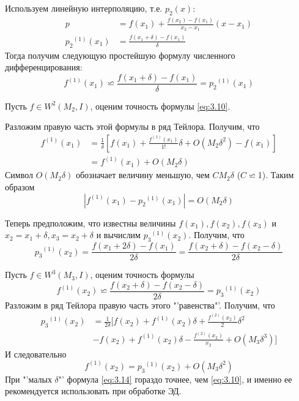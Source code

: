 Используем линейную интерполяцию, т.е. $p_2(x)$:
\begin{equation}
	\begin{aligned}
	p &= f(x_1) + \frac{f(x_2) - f(x_1)}{x_2-x_1}(x-x_1) \\
	{p_2}^{(1)}(x_1) &= \frac{f(x_1+\delta) - f(x_1)}{\delta}
	\end{aligned}
\end{equation}
Тогда получим следующую простейшую формулу численного дифференцирования:
\begin{dmath} \label{eq:3.10}
	f^{(1)}(x_1) \backsimeq \frac{f(x_1 + \delta) - f(x_1)}{\delta} = {p_2}^{(1)}(x_1)
\end{dmath}

Пусть $f \in W^2(M_2, I)$, оценим точность формулы \ref{eq:3.10}.

Разложим правую часть этой формулы в ряд Тейлора. Получим, что
\begin{dmath} 
	\begin{aligned}
f^{(1)}(x_1) &= \frac{1}{\delta} [f(x_1) + \frac{f^{(1)}(x_1)}{1!}\delta + O(M_2\delta^2)-f(x_1)] \\
&= f^{(1)}(x_1) + O(M_2 \delta)
	\end{aligned}
\end{dmath}
Символ \textbf{$O(M_2\delta)$} обозначает величину меньшую, чем $CM_2\delta$ ($C\backsimeq$1). Таким образом
\begin{equation}
	|f^{(1)}(x_1) - {p_2}^{(1)}(x_1)| = O(M_2\delta)
\end{equation}

Теперь предположим, что известны величины $f(x_1), f(x_2), f(x_3)$ и $x_2=x_1+\delta, x_3 = x_2 + \delta$ и вычислим  ${p_3}^{(1)}(x_2)$. Получим, что  
\begin{equation}
	{p_3}^{(1)}(x_2) = \frac{f(x_1+2\delta) - f(x_1)}{2\delta} = \frac{f(x_2+\delta) - f(x_2 - \delta)}{2\delta}
\end{equation}

Пусть $f \in W^3(M_3, I)$, оценим точность формулы
\begin{equation} \label{eq:3.14}
	f^{(1)}(x_2) \backsimeq \frac{f(x_2+\delta) - f(x_2 - \delta)}{2\delta} = {p_3}^{(1)}(x_2)
\end{equation}
Разложим в ряд Тейлора правую часть этого "'равенства"'. Получим, что
\begin{dmath} 
	\begin{aligned}
		{p_3}^{(1)}(x_2) &= \frac{1}{2\delta} [f(x_2) + {f^{(1)}(x_2)}\delta + \frac{f^{(2)}(x_2)}{2} \delta^2 \\ &- f(x_2) + f^{(1)}(x_2)\delta - \frac{f^{(2)}(x_2)}{x_2} + O(M_3\delta^3)]
	\end{aligned}
\end{dmath}
И следовательно
\begin{equation}
	f^{(1)}(x_2) =  {p_3}^{(1)}(x_2) + O(M_3\delta^2)
\end{equation}
При "'малых $\delta$"' формула \ref{eq:3.14} гораздо точнее, чем \ref{eq:3.10}, и именно ее рекомендуется использовать при обработке ЭД.

